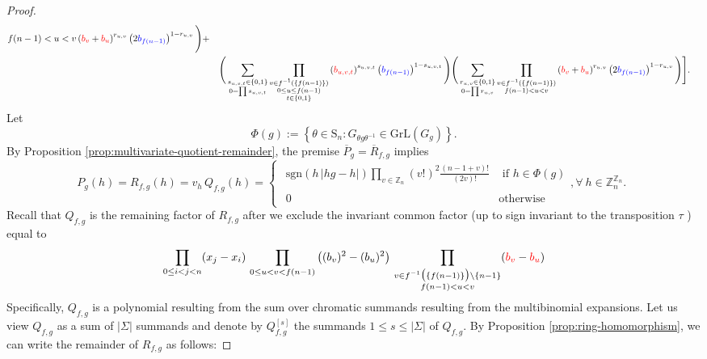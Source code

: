 \begin{proof}
\[\begin{aligned}
{{f(n-1)<u<v
}
}\left({\color{red}b_{v}}+{\color{red}b_{u}}\right)^{r_{u,v}}\left(2{\color{blue}b_{f(n-1)}}\right)^{1-r_{u,v}}\Bigg)+\\
 & \quad\Bigg(\sum_{\substack{s_{u,v,t}\in\{0,1\}\\
0=\prod s_{u,v,t}
}
}\prod_{\substack{v\in f^{-1}(\{f(n-1)\})\\
0\leq u\leq f(n-1)\\
t\in\{0,1\}
}
}\left({\color{red}b_{u,v,t}}\right)^{s_{u,v,t}}\left({\color{blue}b_{f(n-1)}}\right)^{1-s_{u,v,t}}\Bigg)\Bigg(\sum_{\substack{r_{u,v}\in\{0,1\}\\
0=\prod r_{u,v}
}
}\prod_{\substack{v\in f^{-1}(\{f(n-1)\})\\
f(n-1)<u<v
}
}\left({\color{red}b_{v}}+{\color{red}b_{u}}\right)^{r_{u,v}}\left(2{\color{blue}b_{f(n-1)}}\right)^{1-r_{u,v}}\Bigg)\Bigg].
\end{aligned}
\]
Let
\[
\Phi(g):=\left\{ \theta\in\text{S}_{n}:G_{\theta g\theta^{-1}}\in\text{GrL}(G_{g})\right\}.
\]
By Proposition \ref{prop:multivariate-quotient-remainder}, the premise $\overline{P}_{g}=\overline{R}_{f,g}$ implies 
\begin{equation}
P_{g}(h)=R_{f,g}\left(h\right)=v_{h}\,Q_{f,g}\left(h\right)=\begin{cases}
\begin{array}{cc}
\text{sgn}(h\,\left|hg-h\right|)\underset{v\in\mathbb{Z}_{n}}{\prod}\left(v!\right)^{2}\frac{\left(n-1+v\right)!}{\left(2v\right)!} & \text{ if }h\in\Phi(g)\\
\\
0 & \text{otherwise}
\end{array},\forall\:h\in\mathbb{Z}_{n}^{\mathbb{Z}_{n}}.\end{cases}
\end{equation}
Recall that $Q_{f,g}$ is the remaining factor of $R_{f,g}$ after we exclude the invariant common factor (up to sign invariant to the transposition $\tau$ ) equal to
\[
\prod_{0\leq i<j<n}(x_{j}-x_{i})\,\prod_{0\leq u<v<f(n-1)}\big((b_{v})^{2}-(b_{u})^{2}\big)\,\prod_{\substack{v\in f^{-1}\big(\{f(n-1)\}\big)\backslash\{n-1\}\\
f(n-1)<u<v
}
}({\color{red}b_{v}}-{\color{red}b_{u}})
\]
 Specifically, $Q_{f,g}$ is a polynomial resulting from the sum over chromatic summands resulting from the multibinomial expansions.  Let us view $Q_{f,g}$ as a sum of $|\Sigma|$ summands and denote by $Q_{f, g}^{\left[s\right]}$ the summands $1 \leq s \leq |\Sigma|$ of $Q_{f,g}$. By Proposition \ref{prop:ring-homomorphism}, we can write the remainder of $R_{f,g}$ as follows:

\end{proof}
